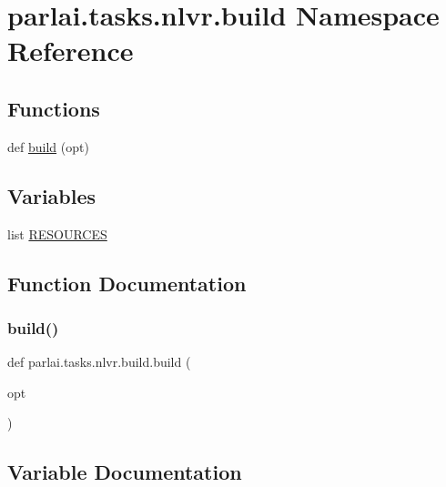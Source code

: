 \hypertarget{namespaceparlai_1_1tasks_1_1nlvr_1_1build}{}\section{parlai.\+tasks.\+nlvr.\+build Namespace Reference}
\label{namespaceparlai_1_1tasks_1_1nlvr_1_1build}
\subsection*{Functions}
\begin{DoxyCompactItemize}
\item 
def \hyperlink{namespaceparlai_1_1tasks_1_1nlvr_1_1build_a2b9db4e1ce7c18cbe126cdaf9ebc7e8a}{build} (opt)
\end{DoxyCompactItemize}
\subsection*{Variables}
\begin{DoxyCompactItemize}
\item 
list \hyperlink{namespaceparlai_1_1tasks_1_1nlvr_1_1build_a305c9c280f85090e29233016f4537e81}{R\+E\+S\+O\+U\+R\+C\+ES}
\end{DoxyCompactItemize}


\subsection{Function Documentation}
\mbox{\label{namespaceparlai_1_1tasks_1_1nlvr_1_1build_a2b9db4e1ce7c18cbe126cdaf9ebc7e8a}} 
\subsubsection{\texorpdfstring{build()}{build()}}
{\footnotesize\ttfamily def parlai.\+tasks.\+nlvr.\+build.\+build (\begin{DoxyParamCaption}\item[{}]{opt }\end{DoxyParamCaption})}



\subsection{Variable Documentation}
\mbox{\label{namespaceparlai_1_1tasks_1_1nlvr_1_1build_a305c9c280f85090e29233016f4537e81}} 
